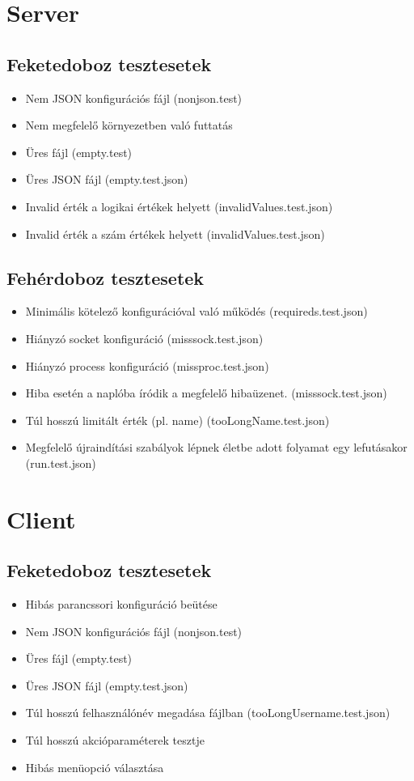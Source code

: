 \documentclass[12pt]{report}
\begin{document}
\section{Server}
\subsection{Feketedoboz tesztesetek}
\begin{itemize}
\item Nem JSON konfigurációs fájl (nonjson.test)
\item Nem megfelelő környezetben való futtatás
\item Üres fájl (empty.test)
\item Üres JSON fájl (empty.test.json)
\item Invalid érték a logikai értékek helyett (invalidValues.test.json)
\item Invalid érték a szám értékek helyett (invalidValues.test.json)
\end{itemize}
\subsection{Fehérdoboz tesztesetek}
\begin{itemize}
\item Minimális kötelező konfigurációval való működés (requireds.test.json)
\item Hiányzó socket konfiguráció (misssock.test.json)
\item Hiányzó process konfiguráció (missproc.test.json)
\item Hiba esetén a naplóba íródik a megfelelő hibaüzenet. (misssock.test.json)
\item Túl hosszú limitált érték (pl. name) (tooLongName.test.json)
\item Megfelelő újraindítási szabályok lépnek életbe adott folyamat egy lefutásakor (run.test.json)
\end{itemize}
\section{Client}
\subsection{Feketedoboz tesztesetek}
\begin{itemize}
\item Hibás parancssori konfiguráció beütése
\item Nem JSON konfigurációs fájl (nonjson.test)
\item Üres fájl (empty.test)
\item Üres JSON fájl (empty.test.json)
\item Túl hosszú felhasználónév megadása fájlban (tooLongUsername.test.json)
\item Túl hosszú akcióparaméterek tesztje
\item Hibás menüopció választása
\end{itemize}
\end{document}
